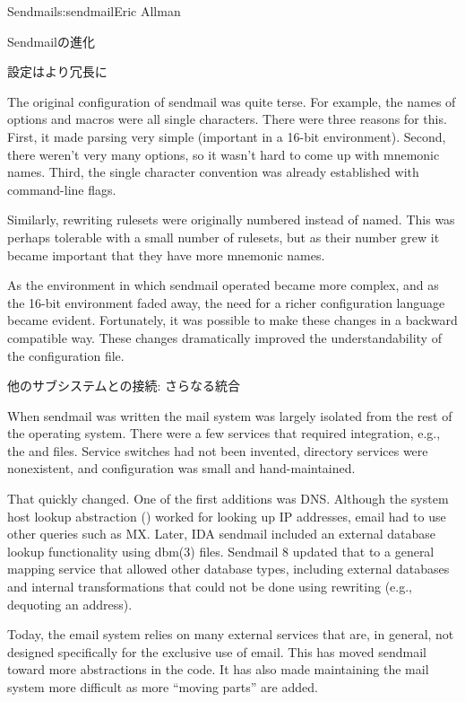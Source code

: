 \begin{aosachapter}{Sendmail}{s:sendmail}{Eric Allman}
\begin{aosasect1}{Sendmailの進化}
\begin{aosasect2}{設定はより冗長に}

The original configuration of sendmail was quite terse. For example,
the names of options and macros were all single characters. There were
three reasons for this. First, it made parsing very simple (important in
a 16-bit environment). Second, there weren't very many options, so it
wasn't hard to come up with mnemonic names.
Third,
the single character convention was already established
with command-line flags.

Similarly, rewriting rulesets were originally numbered instead of
named. This was perhaps tolerable with a small number of rulesets, but
as their number grew it became important that they have more mnemonic
names.

As the environment in which sendmail operated became more complex, and
as the 16-bit environment faded away, the need for a richer
configuration language became evident. Fortunately, it was possible to
make these changes in a backward compatible way. These changes
dramatically improved the understandability of the configuration file.

\end{aosasect2}

\begin{aosasect2}{他のサブシステムとの接続: さらなる統合}

When sendmail was written the mail system was largely isolated from
the rest of the operating system.  There were a few services that
required integration, e.g., the  and
 files.  Service switches had not been invented,
directory services were nonexistent, and configuration was small and
hand-maintained.

That quickly changed. One of the first additions was DNS\@. Although the
system host lookup abstraction () worked for
looking up IP addresses, email had to use other queries such as
MX\@. Later, IDA sendmail included an external database lookup
functionality using dbm(3) files.  Sendmail 8 updated that to a
general mapping service that allowed other database types, including
external databases and internal transformations that could not be done
using rewriting (e.g., dequoting an address).

Today, the email system relies on many external services that are, in
general, not designed specifically for the exclusive use of email.
This has moved sendmail toward more abstractions in the code. It has
also made maintaining the mail system more difficult as more ``moving
parts'' are added.


\end{aosasect2}
\end{aosasect1}
\end{aosachapter}
